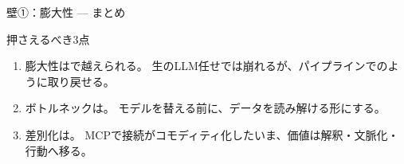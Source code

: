 \begin{frame}{壁①：膨大性 — まとめ}{}
  \begin{keytake}{押さえるべき3点}
    \begin{enumerate}\setlength\itemsep{2mm}
      \item 膨大性はで越えられる。
        生のLLM任せでは崩れるが、パイプラインでのように取り戻せる。
      \item ボトルネックは。
        モデルを替える前に、データを読み解ける形にする。
      \item 差別化は。
        MCPで接続がコモディティ化したいま、価値は解釈・文脈化・行動へ移る。
    \end{enumerate}
  \end{keytake}
  \vskip1.5mm
\end{frame}
